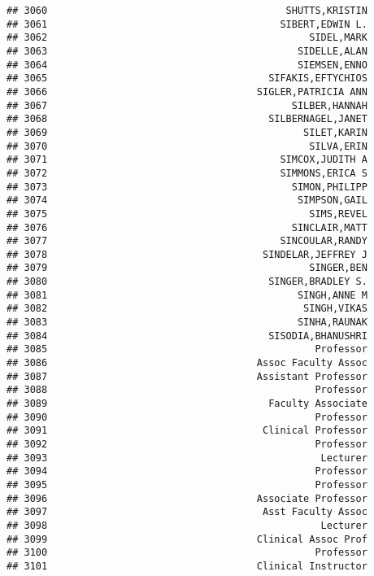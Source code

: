 \documentclass[
]{article}
\begin{document}
\begin{verbatim}
## 3060                                         SHUTTS,KRISTIN
## 3061                                        SIBERT,EDWIN L.
## 3062                                             SIDEL,MARK
## 3063                                           SIDELLE,ALAN
## 3064                                           SIEMSEN,ENNO
## 3065                                      SIFAKIS,EFTYCHIOS
## 3066                                    SIGLER,PATRICIA ANN
## 3067                                          SILBER,HANNAH
## 3068                                      SILBERNAGEL,JANET
## 3069                                            SILET,KARIN
## 3070                                             SILVA,ERIN
## 3071                                        SIMCOX,JUDITH A
## 3072                                        SIMMONS,ERICA S
## 3073                                          SIMON,PHILIPP
## 3074                                           SIMPSON,GAIL
## 3075                                             SIMS,REVEL
## 3076                                          SINCLAIR,MATT
## 3077                                        SINCOULAR,RANDY
## 3078                                     SINDELAR,JEFFREY J
## 3079                                             SINGER,BEN
## 3080                                      SINGER,BRADLEY S.
## 3081                                           SINGH,ANNE M
## 3082                                            SINGH,VIKAS
## 3083                                           SINHA,RAUNAK
## 3084                                      SISODIA,BHANUSHRI
## 3085                                              Professor
## 3086                                    Assoc Faculty Assoc
## 3087                                    Assistant Professor
## 3088                                              Professor
## 3089                                      Faculty Associate
## 3090                                              Professor
## 3091                                     Clinical Professor
## 3092                                              Professor
## 3093                                               Lecturer
## 3094                                              Professor
## 3095                                              Professor
## 3096                                    Associate Professor
## 3097                                     Asst Faculty Assoc
## 3098                                               Lecturer
## 3099                                    Clinical Assoc Prof
## 3100                                              Professor
## 3101                                    Clinical Instructor

\end{verbatim}
\end{document}
